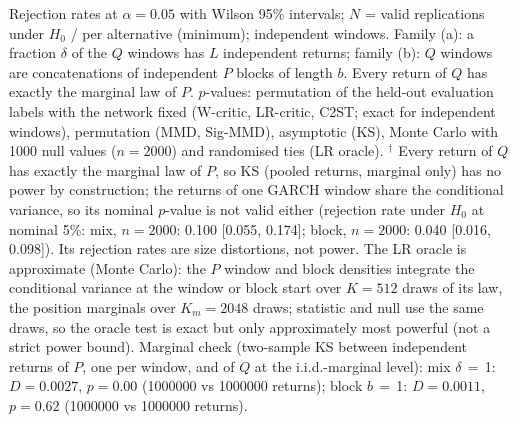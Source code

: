 Rejection rates at $\alpha=0.05$ with Wilson 95\% intervals; $N$ = valid replications under $H_0$ / per alternative (minimum); independent windows. Family (a): a fraction $\delta$ of the $Q$ windows has $L$ independent returns; family (b): $Q$ windows are concatenations of independent $P$ blocks of length $b$. Every return of $Q$ has exactly the marginal law of $P$.
$p$-values: permutation of the held-out evaluation labels with the network fixed (W-critic, LR-critic, C2ST; exact for independent windows), permutation (MMD, Sig-MMD), asymptotic (KS), Monte Carlo with 1000 null values ($n=2000$) and randomised ties (LR oracle).
$^{\dagger}$ Every return of $Q$ has exactly the marginal law of $P$, so KS (pooled returns, marginal only) has no power by construction; the returns of one GARCH window share the conditional variance, so its nominal $p$-value is not valid either (rejection rate under $H_0$ at nominal 5\%: mix, $n=2000$: 0.100 [0.055, 0.174]; block, $n=2000$: 0.040 [0.016, 0.098]). Its rejection rates are size distortions, not power.
The LR oracle is approximate (Monte Carlo): the $P$ window and block densities integrate the conditional variance at the window or block start over $K=512$ draws of its law, the position marginals over $K_m=2048$ draws; statistic and null use the same draws, so the oracle test is exact but only approximately most powerful (not a strict power bound).
Marginal check (two-sample KS between independent returns of $P$, one per window, and of $Q$ at the i.i.d.-marginal level): mix $\delta$$\,=\,$1: $D=0.0027$, $p=0.00$ (1000000 vs 1000000 returns); block $b$$\,=\,$1: $D=0.0011$, $p=0.62$ (1000000 vs 1000000 returns).
